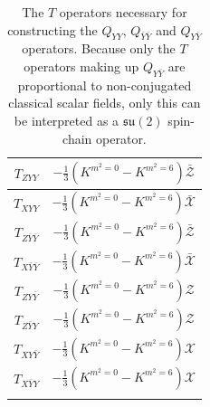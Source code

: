 \begin{table}
%
\begin{center}
%
\begingroup
\setlength{\tabcolsep}{7pt} %
\renewcommand{\arraystretch}{2.0} %
%
\begin{tabular}{ !{\vrule width 1.5pt}c!{\vrule width 1.5pt}c!{\vrule width 1.5pt} }
 	$T_{ZYY}$ & $-\frac{1}{3} \left( K^{m^2=0} - K^{m^2=6} \right) \bar{\mathcal{Z}}$ \\
 	\hline
 	$T_{XYY}$ & $-\frac{1}{3} \left( K^{m^2=0} - K^{m^2=6} \right) \bar{\mathcal{X}}$ \\
 	\hline
 	$T_{Z\bar{Y}\bar{Y}}$ & $-\frac{1}{3} \left( K^{m^2=0} - K^{m^2=6} \right) \bar{\mathcal{Z}}$ \\
 	\hline
 	$T_{X\bar{Y}\bar{Y}}$ & $-\frac{1}{3} \left( K^{m^2=0} - K^{m^2=6} \right) \bar{\mathcal{X}}$ \\
 	\hline
 	$T_{ZY\bar{Y}}$ & $-\frac{1}{3} \left( K^{m^2=0} - K^{m^2=6} \right) \mathcal{Z}$ \\
 	\hline
 	$T_{Z\bar{Y}Y}$ & $-\frac{1}{3} \left( K^{m^2=0} - K^{m^2=6} \right) \mathcal{Z}$ \\
 	\hline
 	$T_{XY\bar{Y}}$ & $-\frac{1}{3} \left( K^{m^2=0} - K^{m^2=6} \right) \mathcal{X}$ \\
	\hline 	
 	$T_{X\bar{Y}Y}$ & $-\frac{1}{3} \left( K^{m^2=0} - K^{m^2=6} \right) \mathcal{X}$ \\
\end{tabular}
%
\endgroup
%
\end{center}
%
\caption[$T$ operators necessary for constructing $Q_{YY}$, $Q_{\bar{Y} \bar{Y}}$ and $Q_{Y \bar{Y}}$]{The $T$ operators necessary for constructing the $Q_{YY}$, $Q_{\bar{Y} \bar{Y}}$ and $Q_{Y \bar{Y}}$ operators. Because only the $T$ operators making up $Q_{Y \bar{Y}}$ are proportional to non-conjugated classical scalar fields, only this can be interpreted as a $\mathfrak{su}(2)$ spin-chain operator.}
%
\label{tab:T-table-4}
%
\end{table}
%
%

